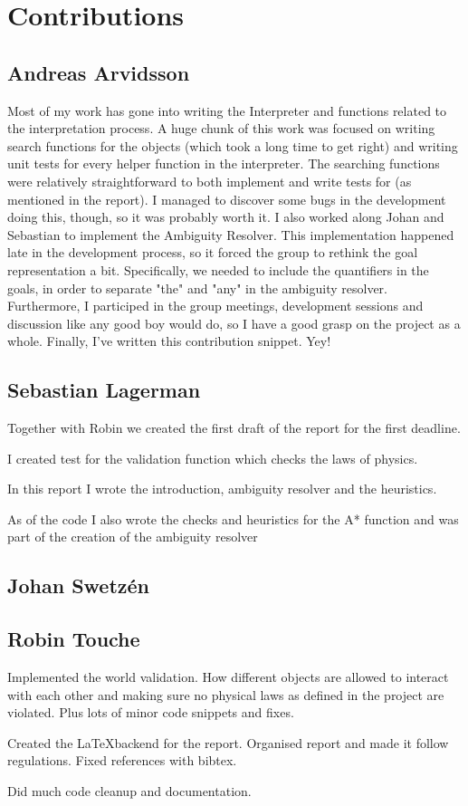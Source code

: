 \section*{Contributions}
\subsection*{Andreas Arvidsson}
Most of my work has gone into writing the Interpreter and functions related to the interpretation process.
A huge chunk of this work was focused on writing search functions for the objects (which took a long time to get right) and writing unit tests for every helper function in the interpreter.
The searching functions were relatively straightforward to both implement and write tests for (as mentioned in the report).
I managed to discover some bugs in the development doing this, though, so it was probably worth it.
\newline
\newline
I also worked along Johan and Sebastian to implement the Ambiguity Resolver. This implementation happened late in the development process, so it forced the group to rethink the goal representation a bit. Specifically, we needed to include the quantifiers in the goals, in order to separate "the" and "any" in the ambiguity resolver.
\newline
\newline
Furthermore, I participed in the group meetings, development sessions and discussion like any good boy would do, so I have a good grasp on the project as a whole.
\newline
\newline
Finally, I've written this contribution snippet. Yey!

\subsection*{Sebastian Lagerman}
Together with Robin we created the first draft of the report for the first deadline.

I created test for the validation function which checks the laws of physics.

In this report I wrote the introduction, ambiguity resolver and the heuristics.

As of the code I also wrote the checks and heuristics for the A* function and was part of the creation of the ambiguity resolver

\subsection*{Johan Swetz\'en}
\subsection*{Robin Touche}
Implemented the world validation.
How different objects are allowed to interact with each other and making sure no physical laws as defined in the project are violated.
Plus lots of minor code snippets and fixes.

Created the \LaTeX  backend for the report.
Organised report and made it follow regulations.
Fixed references with bibtex.

Did much code cleanup and documentation.
